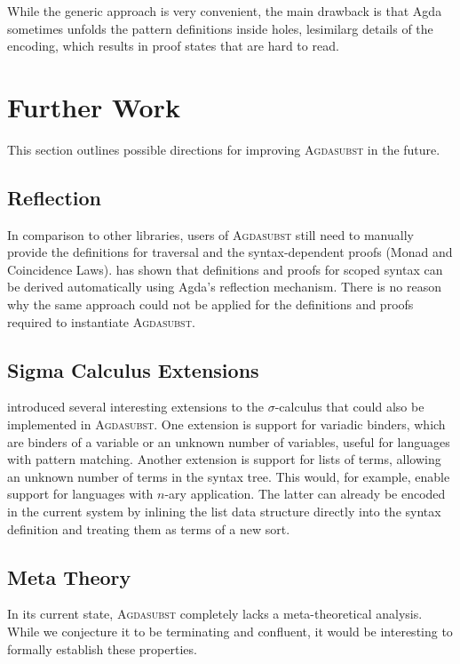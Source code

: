 \documentclass[screen,nonacm]{acmart}
\begin{document}
\noindent While the
generic approach is very convenient, the main drawback is that Agda sometimes
unfolds the pattern definitions inside holes, lesimilarg details of the encoding,
which results in proof states that are hard to read.

\section{Further Work}\label{sec:wrk}
This section outlines possible directions for improving \textsc{Agdasubst} in
the future.

\subsection*{Reflection}
In comparison to other libraries, users of
\textsc{Agdasubst} still need to manually provide the definitions for traversal
and the syntax-dependent proofs (Monad and Coincidence Laws).
\citet{saffrich:LIPIcs.ITP.2024.32} has shown that definitions and proofs for
scoped syntax can be derived automatically using Agda's reflection mechanism.
There is no reason why the same approach could not be applied for the
definitions and proofs required to instantiate \textsc{Agdasubst}.

\subsection*{Sigma Calculus Extensions}
\citet{Stark:2020:Mechanising} introduced several interesting extensions to the $σ$-calculus that could also be implemented in \textsc{Agdasubst}. One extension is support for variadic binders, which are binders of a variable or an unknown number of variables, useful for languages with pattern matching. Another extension is support for lists of terms, allowing an unknown number of terms in the syntax tree. This would, for example, enable support for languages with $n$-ary application.
The latter can already be encoded in the current system by inlining the list
data structure directly into the syntax definition and treating
them as terms of a new sort.

\subsection*{Meta Theory}
In its current state, \textsc{Agdasubst} completely lacks a meta-theoretical
analysis. While we conjecture it to be terminating and confluent, it would be
interesting to formally establish these properties.
\end{document}
